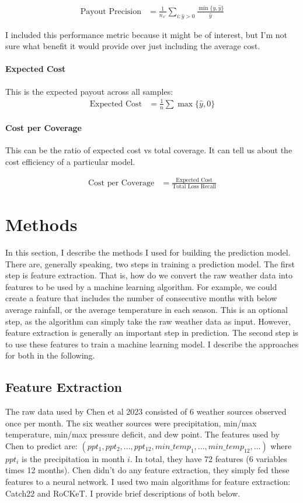 \documentclass[11pt]{article}
\begin{document}
      \begin{align*}
        \text{Payout Precision} &= \frac{1}{n_{s'}} \sum_{i:\hat{y} > 0} \frac{\min\{y,\hat{y}\}}{\hat{y}}
      \end{align*}

      I included this performance metric because it might be of interest, but I'm not sure what benefit it would provide over just including the average cost. 

      \paragraph{Expected Cost} This is the expected payout across all samples: 
      \begin{align*}
        \text{Expected Cost} &= \frac{1}{n} \sum \max \{\hat{y},0\}
      \end{align*}

      \paragraph*{Cost per Coverage} This can be the ratio of expected cost vs total coverage. It can tell us about the cost efficiency of a particular model. 

      \begin{align*}
          \text{Cost per Coverage} &= \frac{\text{Expected Cost}}{\text{Total Loss Recall}}
      \end{align*}

\section{Methods}
    In this section, I describe the methods I used for building the prediction model. There are, generally speaking, two steps in training a prediction model. The first step is feature extraction. That is, how do we convert the raw weather data into features to be used by a machine learning algorithm. For example, we could create a feature that includes the number of consecutive months with below average rainfall, or the average temperature in each season. This is an optional step, as the algorithm can simply take the raw weather data as input. However, feature extraction is generally an important step in prediction. The second step is to use these features to train a machine learning model. I describe the approaches for both in the following. 
    \subsection{Feature Extraction}
      The raw data used by Chen et al 2023 consisted of 6 weather sources observed once per month. The six weather sources were precipitation, min/max temperature, min/max pressure deficit, and dew point. The features used by Chen to predict are: $(ppt_1,ppt_2,...,ppt_{12},min\_temp_1,...,min\_temp_{12},...)$ where $ppt_i$ is the precipitation in month $i$. In total, they have 72 features (6 variables times 12 months). Chen didn't do any feature extraction, they simply fed these features to a neural network. I used two main algorithms for feature extraction: Catch22 and RoCKeT. I provide brief descriptions of both below. 
\end{document}
